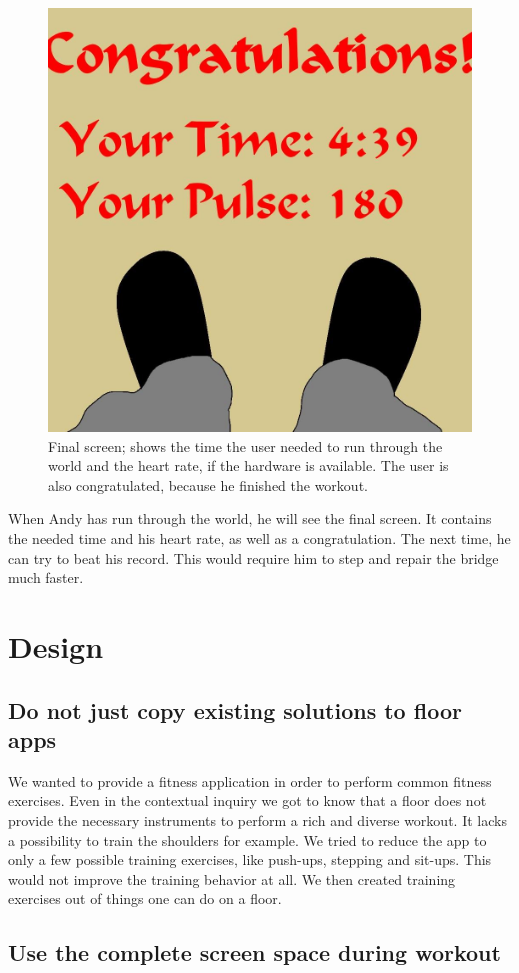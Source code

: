 \documentclass{sigchi}
\begin{document}
    \begin{figure}[htb]
      \centering
      \includegraphics[width=0.32\linewidth]{Image_17.jpg}
      \caption{Final screen; shows the time the user needed to run through the world and the heart rate, if the hardware is available. The user is also congratulated, because he finished the workout.}
      \label{fig:end}
    \end{figure}

    When Andy has run through the world, he will see the final screen. It contains the needed time and his heart rate, as well as a congratulation. The next time, he can try to beat his record. This would require him to step and repair the bridge much faster. 

\clearpage

\section{Design}

  \subsection{Do not just copy existing solutions to floor apps} %
  \label{sub:do_not_just_copy_existing_solution_to_floor_apps}
  
    We wanted to provide a fitness application in order to perform common fitness exercises. Even in the contextual inquiry we got to know that a floor does not provide the necessary instruments to perform a rich and diverse workout. It lacks a possibility to train the shoulders for example. We tried to reduce the app to only a few possible training exercises, like push-ups, stepping and sit-ups. This would not improve the training behavior at all. We then created training exercises out of things one can do on a floor.

  \subsection{Use the complete screen space during workout} %
  \label{sub:use_the_complete_screen_space_during_workout}
\end{document}
